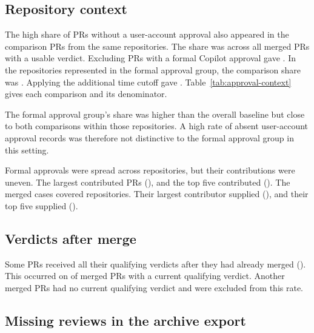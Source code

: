 \documentclass[11pt,letterpaper]{article}
\begin{document}
\subsection{Repository context}

The high share of PRs without a user-account approval also appeared in
the comparison PRs from the same repositories. The share was
\TextBaselineRate{} across all merged PRs with a usable verdict.
Excluding PRs with a formal Copilot approval gave
\NonformalBaselineRate{}. In the repositories represented in the formal
approval group, the comparison share was \SharedBaselineRate{}.
Applying the additional time cutoff gave \PeriodBaselineRate{}.
Table~\ref{tab:approval-context} gives each comparison and its denominator.



The formal approval group's \FormalNoUserRate{} share was higher than
the overall baseline but close to both comparisons within those
repositories. A high rate of absent user-account approval records was
therefore not distinctive to the formal approval group in this setting.

Formal approvals were spread across \FormalRepoCount{} repositories,
but their contributions were uneven. The largest contributed
\FormalRepoTopOnePRs{} PRs (\FormalRepoTopOneRate{}), and the top five
contributed \FormalRepoTopFivePRs{} (\FormalRepoTopFiveRate{}).
The merged cases covered \MergedFormalRepoCount{} repositories.
Their largest contributor supplied \MergedFormalRepoTopOnePRs{}
(\MergedFormalRepoTopOneRate{}), and their top five supplied
\MergedFormalRepoTopFivePRs{} (\MergedFormalRepoTopFiveRate{}).

\subsection{Verdicts after merge}

Some PRs received all their qualifying verdicts after they had already
merged (\PostMergeRate{}). This occurred on \PostMergeCount{} of
\PostMergeDenominator{} merged PRs with a current qualifying verdict.
Another \NoCurrentMergedReview{} merged PRs had no current qualifying
verdict and were excluded from this rate.

\subsection{Missing reviews in the archive export}
\end{document}
